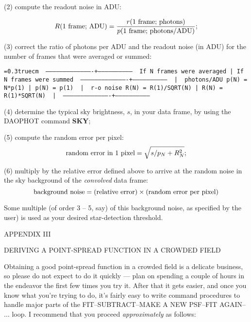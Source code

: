 \item{(2)} compute the readout noise in ADU: 

$$
R(\hbox{\rm 1 frame; ADU}) = {r(\hbox{\rm 1 frame; photons}) \over
p(\hbox{\rm 1 frame; photons/ADU})};$$

\item{(3)} correct the ratio of photons per ADU and the readout noise 
(in ADU) for the number of frames that were averaged or summed:

\bigskip
{\noindent\obeylines\obeyspaces\frenchspacing\tt\baselineskip=0.3truecm
\ ----------------------------------------+-----------------------------
\               If N frames were averaged |  If N frames were summed
\ ----------------------------------------+-----------------------------
\                                         |
\ photons/ADU   p(N) = N*p(1)             |  p(N) = p(1) 
\                                         |
\ r-o noise     R(N) = R(1)/SQRT(N)       |  R(N) = R(1)*SQRT(N)
\                                         |
\ ----------------------------------------+-----------------------------
}
\bigskip

\item{(4)} determine the typical sky brightness, $s$, in your data
frame, by using the DAOPHOT command {\bf SKY}; 

\item{(5)} compute the random error per pixel: 
$$ \hbox{\rm random error in 1 pixel} = \sqrt{s/p_N + R_N^2};$$ 

\item{(6)} multiply by the relative error defined above to arrive at the
random noise in the sky background of the {\it convolved\/} data frame:
$$
\hbox{\rm background noise} = (\hbox{\rm relative error}) \times 
(\hbox{\rm random error per pixel})
$$

Some multiple (of order 3 -- 5, say) of this background noise, as
specified by the user) is used as your desired star-detection threshold.

\vfill
\eject
\centerline {APPENDIX III}
\bigskip
\centerline{DERIVING A POINT-SPREAD FUNCTION IN A CROWDED FIELD}
\bigskip

Obtaining a good point-spread function in a crowded field is a delicate
business, so please do not expect to do it quickly --- plan on spending
a couple of hours in the endeavor the first few times you try it.
After that it gets easier, and once you know what you're trying to do,
it's fairly easy to write command procedures to handle major parts of
the FIT--SUBTRACT--MAKE A NEW PSF--FIT AGAIN--$\ldots$ loop.  I
recommend that you proceed {\it approximately} as follows:

